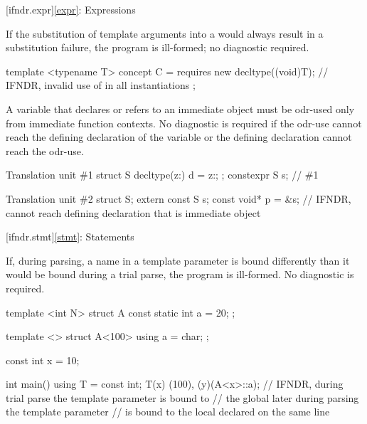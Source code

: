 [ifndr.expr]{\ref*{expr}: Expressions}


\pnum
If the substitution of template arguments
into a 
would always result in a substitution failure,
the program is ill-formed; no diagnostic required.

\pnum
\begin{example}
\begin{codeblock}
template <typename T> concept C = requires {
  new decltype((void)T{});  // IFNDR, invalid use of  in all instantiations
};
\end{codeblock}
\end{example}


\pnum
A variable that
declares or refers to
an immediate object
must be odr-used
only from
immediate function contexts.
No diagnostic is required
if the odr-use cannot reach
the defining declaration
of the variable
or the defining declaration
cannot reach
the odr-use.

\pnum
\begin{example}
\begin{codeblocktu}{Translation unit \#1}
struct S { decltype(^^::) d = ^^::; };
constexpr S s;                  // \#1
\end{codeblocktu}
\begin{codeblocktu}{Translation unit \#2}
struct S;
extern const S s;
const void* p = &s;             // IFNDR, cannot reach defining declaration that is immediate object
\end{codeblocktu}
\end{example}

[ifndr.stmt]{\ref*{stmt}: Statements}


\pnum
If, during
parsing, a name in a template parameter is bound differently than it would be bound during a trial parse,
the program is ill-formed. No diagnostic is required.

\pnum
\begin{example}
\begin{codeblock}
template <int N> struct A { const static int a = 20; };

template <> struct A<100> { using a = char; };

const int x = 10;

int main() {
  using T = const int;
  T(x)
  (100), (y)(A<x>::a);  // IFNDR, during trial parse the template parameter  is bound to
                        // the global  later during parsing the template parameter 
                        // is bound to the local  declared on the same line
}
\end{codeblock}
\end{example}


